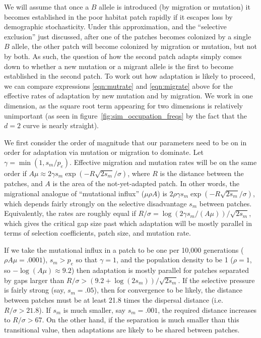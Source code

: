 \documentclass{article}
\newcommand{\linelabel}[1]{}
\begin{document}
We will assume that once a $B$ allele is introduced (by migration or mutation) 
it becomes established in the poor habitat patch rapidly
if it escapes loss by demographic stochasticity.
Under this approximation, and the ``selective exclusion'' just discussed,
after one of the patches becomes colonized by a single $B$ allele, 
the other patch will become colonized by migration or mutation, but not by both. 
As such, the question of how the second patch adapts
simply comes down to whether a new mutation or a migrant allele is the first to become established in the second patch. 
To work out how adaptation is likely to proceed, 
we can compare expressions \eqref{eqn:mutrate} and \eqref{eqn:migrate} above
for the effective rates of adaptation by new mutation and by migration.
We work in one dimension, as the square root term appearing for two dimensions is relatively unimportant 
(as seen in figure~\ref{fig:sim_occupation_freqs} by the fact that the $d=2$ curve is nearly straight).
\linelabel{rr:sqrt_term}

We first consider the order of magnitude that our parameters need to
be on in order for adaptation via mutation or migration to dominate.
Let $\gamma = \min(1,s_m/p_e)$.
Effective migration and mutation rates will be on the same order if 
$A \mu \approx 2 \gamma s_m \exp(- R \sqrt{2 s_m} / \sigma)$,
where $R$ is the distance between the patches,
and $A$ is the area of the not-yet-adapted patch.
In other words, the migrational analogue of ``mutational influx'' ($\mu \rho A$) 
is $2 \rho \gamma s_m \exp(- R \sqrt{2 s_m} / \sigma)$,
which depends fairly strongly on the selective disadvantage $s_m$ between patches.
Equivalently, the rates are roughly equal if
$R/\sigma = \log(2 \gamma s_m/(A \mu))/\sqrt{2s_m}$,
which gives the critical gap size past which adaptation will be mostly parallel
in terms of selection coefficients, patch size, and mutation rate.


If we take the mutational influx in a patch to be one per 10,000 generations ($\rho A \mu = .0001$),
$s_m>p_e$ so that $\gamma=1$,
and the population density to be 1 ($\rho =1$, so $-\log(A\mu)\approx 9.2$)
then adaptation is mostly parallel for patches separated by gaps larger than $R/\sigma > (9.2+\log(2s_m))/\sqrt{2s_m}$.
If the selective pressure is fairly strong (say, $s_m=.05$),
then for convergence to be likely,
the distance between patches must be at least 21.8 times the dispersal distance (i.e.\ $R/\sigma > 21.8$).
If $s_m$ is much smaller, say $s_m = .001$, 
the required distance increases to $R/\sigma > 67$.
On the other hand, if the separation is much smaller than this transitional value, 
then adaptations are likely to be shared between patches.
\end{document}
